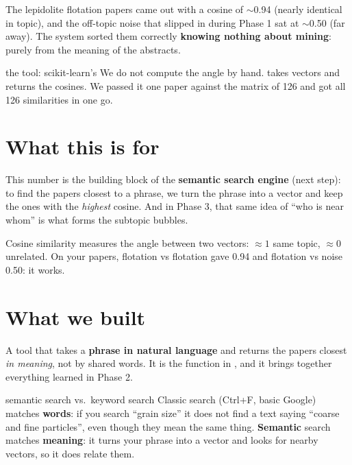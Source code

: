 \documentclass[11pt,a4paper]{article}
\begin{document}
The lepidolite flotation papers came out with a cosine of $\sim$0.94 (nearly identical in
topic), and the off-topic noise that slipped in during Phase 1 sat at $\sim$0.50 (far away).
The system sorted them correctly \textbf{knowing nothing about mining}: purely from the
meaning of the abstracts.

\begin{concepto}{the tool: scikit-learn's }
We do not compute the angle by hand.
 takes vectors and returns the cosines.
We passed it one paper against the matrix of 126 and got all 126 similarities in one go.
\end{concepto}

\section{What this is for}

This number is the building block of the \textbf{semantic search engine} (next step): to find
the papers closest to a phrase, we turn the phrase into a vector and keep the ones with the
\emph{highest} cosine. And in Phase 3, that same idea of ``who is near whom'' is what forms
the subtopic bubbles.

\begin{resumen}
Cosine similarity measures the angle between two vectors: $\approx 1$ same topic, $\approx 0$
unrelated. On your papers, flotation vs flotation gave 0.94 and flotation vs noise 0.50: it
works.
\end{resumen}
\clearpage
{}
{}

\section{What we built}

A tool that takes a \textbf{phrase in natural language} and returns the papers closest
\emph{in meaning}, not by shared words. It is the  function in
, and it brings together everything learned in Phase 2.

\begin{concepto}{semantic search vs.\ keyword search}
Classic search (Ctrl+F, basic Google) matches \textbf{words}: if you search ``grain size'' it
does not find a text saying ``coarse and fine particles'', even though they mean the same
thing. \textbf{Semantic} search matches \textbf{meaning}: it turns your phrase into a vector
and looks for nearby vectors, so it does relate them.
\end{concepto}
\end{document}
